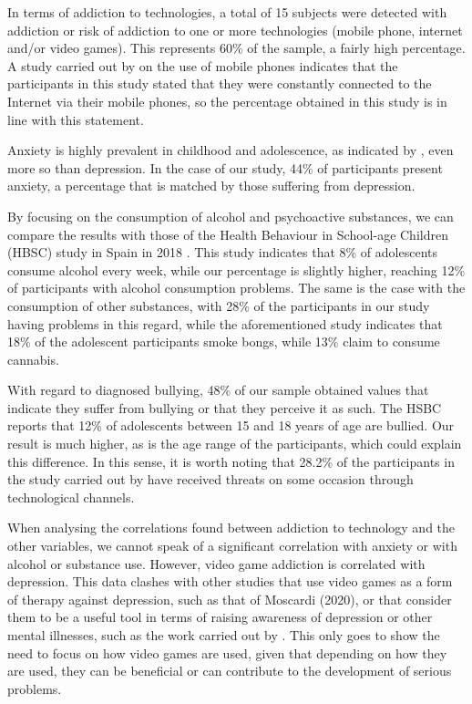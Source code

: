 \documentclass[english]{textolivre}
\begin{document}
In terms of addiction to technologies, a total of 15 subjects were detected with addiction or risk of addiction to one or more technologies (mobile phone, internet and/or video games). This represents 60\% of the sample, a fairly high percentage. A study carried out by \textcite{cuestacambra2020smartphone} %
on the use of mobile phones indicates that the participants in this study stated that they were constantly connected to the Internet via their mobile phones, so the percentage obtained in this study is in line with this statement.

Anxiety is highly prevalent in childhood and adolescence, as indicated by \textcite{sanchez2020}, %
even more so than depression. In the case of our study, 44\% of participants present anxiety, a percentage that is matched by those suffering from depression.

By focusing on the consumption of alcohol and psychoactive substances, we can compare the results with those of the Health Behaviour in School-age Children (HBSC) study in Spain in 2018 \cite{moreno2018adolescencia}. %
This study indicates that 8\% of adolescents consume alcohol every week, while our percentage is slightly higher, reaching 12\% of participants with alcohol consumption problems. The same is the case with the consumption of other substances, with 28\% of the participants in our study having problems in this regard, while the aforementioned study indicates that 18\% of the adolescent participants smoke bongs, while 13\% claim to consume cannabis.

With regard to diagnosed bullying, 48\% of our sample obtained values that indicate they suffer from bullying or that they perceive it as such. The HSBC reports that 12\% of adolescents between 15 and 18 years of age are bullied. Our result is much higher, as is the age range of the participants, which could explain this difference. In this sense, it is worth noting that 28.2\% of the participants in the study carried out by \textcite{plaza2021evolucion} %
have received threats on some occasion through technological channels.

When analysing the correlations found between addiction to technology and the other variables, we cannot speak of a significant correlation with anxiety or with alcohol or substance use. However, video game addiction is correlated with depression. This data clashes with other studies that use video games as a form of therapy against depression, such as that of Moscardi (2020), or that consider them to be a useful tool in terms of raising awareness of depression or other mental illnesses, such as the work carried out by \textcite{paredesotero2020enemigo}. %
This only goes to show the need to focus on how video games are used, given that depending on how they are used, they can be beneficial or can contribute to the development of serious problems.
\end{document}
